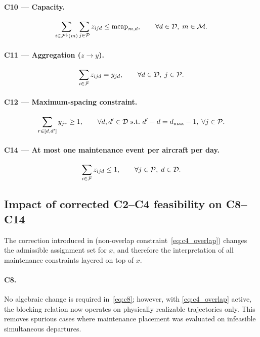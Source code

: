 \paragraph{C10 — Capacity.}
\begin{equation}\label{eq:c10}
  \sum_{i \in \mathcal{F}^{\downarrow}(m)} \sum_{j \in \mathcal{P}} z_{ijd}
  \le \text{mcap}_{m,d},
  \qquad \forall d \in \mathcal{D},\; m \in \mathcal{M}.
\end{equation}

\paragraph{C11 — Aggregation ($z \to y$).}
\begin{equation}\label{eq:c11}
  \sum_{i \in \mathcal{F}} z_{ijd} = y_{jd},
  \qquad \forall d \in \mathcal{D},\; j \in \mathcal{P}.
\end{equation}

\paragraph{C12 — Maximum-spacing constraint.}
\begin{equation}\label{eq:c12}
  \sum_{r \in [d, d']} y_{jr} \ge 1,
  \qquad \forall d, d' \in \mathcal{D} \text{ s.t.\ } d' - d = d_{\max} - 1,\;
  \forall j \in \mathcal{P}.
\end{equation}

\paragraph{C14 — At most one maintenance event per aircraft per day.}
\begin{equation}\label{eq:c14}
  \sum_{i \in \mathcal{F}} z_{ijd} \le 1,
  \qquad \forall j \in \mathcal{P},\; d \in \mathcal{D}.
\end{equation}

\subsection{Impact of corrected C2--C4 feasibility on C8--C14}
\label{subsec:c2c4_impact_maintenance}

The correction introduced in  (non-overlap
constraint~\eqref{eq:c4_overlap}) changes the admissible assignment set for
$x$, and therefore the interpretation of all maintenance constraints layered on
top of $x$.

\paragraph{C8.}
No algebraic change is required in~\eqref{eq:c8}; however, with
\eqref{eq:c4_overlap} active, the blocking relation now operates on physically
realizable trajectories only. This removes spurious cases where maintenance
placement was evaluated on infeasible simultaneous departures.

